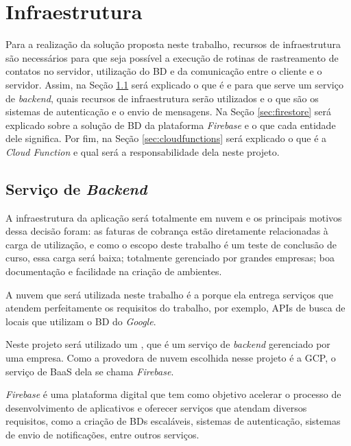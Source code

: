 \chapter{Infraestrutura}\label{chp:infraestrutura}

Para a realização da solução proposta neste trabalho, recursos de infraestrutura são necessários para que seja possível a execução de rotinas de rastreamento de contatos no servidor, utilização do BD e da comunicação entre o cliente e o servidor. Assim, na Seção \ref{sec:firebase} será explicado o que é e para que serve um serviço de \textit{backend}, quais recursos de infraestrutura serão utilizados e o que são os sistemas de autenticação e o envio de mensagens. Na Seção \ref{sec:firestore} será explicado sobre a solução de BD da plataforma \textit{Firebase} e o que cada entidade dele significa. Por fim, na Seção \ref{sec:cloudfunctions} será explicado o que é a \textit{Cloud Function} e qual será a responsabilidade dela neste projeto.

\section{Serviço de \textit{Backend}}\label{sec:firebase}

A infraestrutura da aplicação será totalmente em nuvem e os principais motivos dessa decisão foram: as faturas de cobrança estão diretamente relacionadas à carga de utilização, e como o escopo deste trabalho é um teste de conclusão de curso, essa carga será baixa; totalmente gerenciado por grandes empresas; boa documentação e facilidade na criação de ambientes.

A nuvem que será utilizada neste trabalho é a  porque ela entrega serviços que atendem perfeitamente os requisitos do trabalho, por exemplo, APIs de busca de locais que utilizam o BD do \textit{Google}.

Neste projeto será utilizado um , que é um serviço de \textit{backend} gerenciado por uma empresa. Como a provedora de nuvem escolhida nesse projeto é a GCP, o serviço de BaaS dela se chama \textit{Firebase}.

\textit{Firebase} é uma plataforma digital que tem como objetivo acelerar o processo de desenvolvimento de aplicativos e oferecer serviços que atendam diversos requisitos, como a criação de BDs escaláveis, sistemas de autenticação, sistemas de envio de notificações, entre outros serviços.

